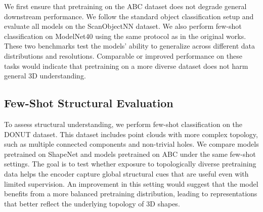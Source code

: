 We first ensure that pretraining on the ABC dataset does not degrade general downstream performance. We follow the standard object classification setup and evaluate all models on the ScanObjectNN dataset. We also perform few-shot classification on ModelNet40 using the same protocol as in the original works. These two benchmarks test the models’ ability to generalize across different data distributions and resolutions. Comparable or improved performance on these tasks would indicate that pretraining on a more diverse dataset does not harm general 3D understanding.



\subsection{Few-Shot Structural Evaluation}

To assess structural understanding, we perform few-shot classification on the DONUT dataset. This dataset includes point clouds with more complex topology, such as multiple connected components and non-trivial holes. We compare models pretrained on ShapeNet and models pretrained on ABC under the same few-shot settings. The goal is to test whether exposure to topologically diverse pretraining data helps the encoder capture global structural cues that are useful even with limited supervision. An improvement in this setting would suggest that the model benefits from a more balanced pretraining distribution, leading to representations that better reflect the underlying topology of 3D shapes.


